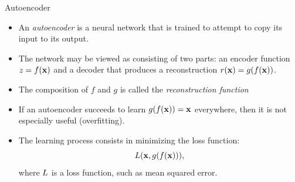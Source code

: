 \documentclass[xcolor=pdftex,dvipsnames,table,mathserif]{beamer}
\begin{document}
\begin{frame}{Autoencoder}
\begin{itemize}
\item An \emph{autoencoder} is a neural network that is trained to attempt to copy its input to its output.
\item The network may be viewed as consisting of two parts: an
encoder function $z = f (\mathbf{x})$ and a decoder that produces a reconstruction $r(\mathbf{x}) = g(f(\mathbf{x}))$.
\item The composition of $f$ and $g$ is called the \emph{reconstruction function}
\item If an autoencoder succeeds to learn $g(f (\mathbf{x})) = \mathbf{x}$ everywhere, then it is not especially useful (overfitting).
\item The learning process consists in minimizing the loss function:
\begin{equation}
L ( \mathbf{x} , g(f(\mathbf{x}))),
\end{equation}
where $L$ is a loss function, such as mean squared error.
\end{itemize}
\begin{figure}
\centering
{}
\end{figure}
\end{frame}
\end{document}
